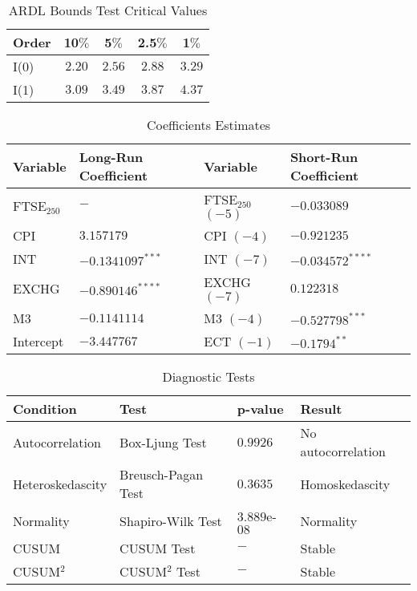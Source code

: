 \documentclass[11pt,a4paper]{article}
\begin{document}
\begin{table}[h!]
    \centering
    \caption{ARDL Bounds Test Critical Values}
    \begin{tabular}{lcccc}
        \toprule
        \textbf{Order} & \textbf{10$\%$} & \textbf{5$\%$} & \textbf{2.5$\%$} & \textbf{1$\%$} \\
        \midrule
        I(0) & $2.20$ & $2.56$ & $2.88$ & $3.29$ \\
        I(1) & $3.09$ & $3.49$ & $3.87$  & $4.37$ \\
        \bottomrule
    \end{tabular}
\end{table}
\clearpage

\begin{table}[h!]
    \centering
    \caption{Coefficients Estimates}
    \begin{tabular}{llll}
        \toprule
        \textbf{Variable} & \textbf{Long-Run Coefficient} & \textbf{Variable} & \textbf{Short-Run Coefficient} \\
        \midrule
        FTSE$_{250}$ & $-$ & FTSE$_{250}$ $(-5)$  & $-0.033089$ \\
        CPI & $3.157179$ & CPI $(-4)$ & $-0.921235$ \\
        INT & $-0.1341097^{***}$ & INT $(-7)$ & $-0.034572^{****}$\\
        EXCHG &  $-0.890146^{****}$ & EXCHG $(-7)$ & $0.122318$ \\
        M3 & $-0.1141114$ & M3 $(-4)$ & $-0.527798^{***}$ \\
        Intercept & $-3.447767$ & ECT $(-1)$ & $-0.1794^{**}$ \\
        \bottomrule
    \end{tabular}
\end{table}

\begin{table}[h!]
    \centering
    \caption{Diagnostic Tests}
    \begin{tabular}{llll}
        \toprule
        \textbf{Condition} & \textbf{Test} & \textbf{p-value} & \textbf{Result} \\
        \midrule
        Autocorrelation & Box-Ljung Test & $0.9926$ & No autocorrelation \\
        Heteroskedascity & Breusch-Pagan Test & $0.3635$ & Homoskedascity \\
        Normality & Shapiro-Wilk Test & $3.889$e-$08$ & Normality \\
        CUSUM & CUSUM Test & $-$ & Stable \\
        CUSUM$^2$ & CUSUM$^2$ Test & $-$ & Stable \\
        \bottomrule
    \end{tabular}
\end{table}
\end{document}
